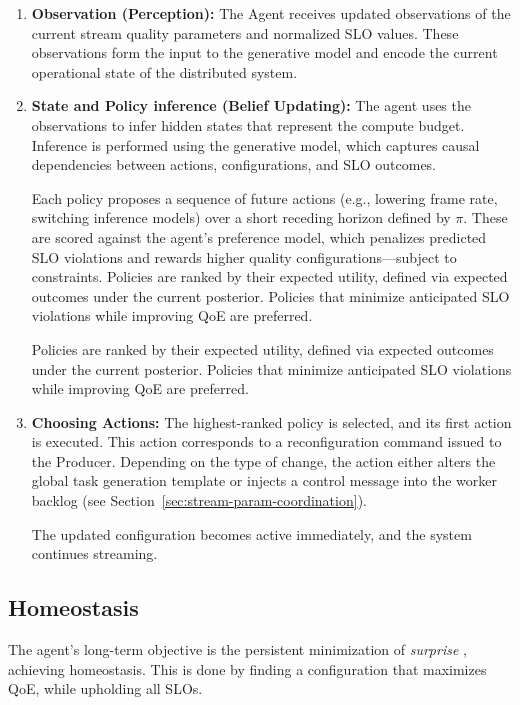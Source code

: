 \begin{enumerate}
    \item \textbf{Observation (Perception):} The Agent receives updated observations of the current stream quality parameters and normalized SLO values. These observations form the input to the generative model and encode the current operational state of the distributed system.
    \item \textbf{State and Policy inference (Belief Updating):} The agent uses the observations to infer hidden states that represent the compute budget. Inference is performed using the generative model, which captures causal dependencies between actions, configurations, and SLO outcomes. 
    
    Each policy proposes a sequence of future actions (e.g., lowering frame rate, switching inference models) over a short receding horizon defined by \(\pi\). These are scored against the agent’s preference model, which penalizes predicted SLO violations and rewards higher quality configurations—subject to constraints. Policies are ranked by their expected utility, defined via expected outcomes under the current posterior. Policies that minimize anticipated SLO violations while improving QoE are preferred.

    Policies are ranked by their expected utility, defined via expected outcomes under the current posterior. Policies that minimize anticipated SLO violations while improving QoE are preferred.
    
    \item \textbf{Choosing Actions:} The highest-ranked policy is selected, and its first action is executed. This action corresponds to a reconfiguration command issued to the Producer. Depending on the type of change, the action either alters the global task generation template or injects a control message into the worker backlog (see Section~\ref{sec:stream-param-coordination}).

The updated configuration becomes active immediately, and the system continues streaming.
\end{enumerate}




\subsection{Homeostasis}
The agent's long-term objective is the persistent minimization of \textit{surprise} \cite{sedlak_adaptive_2024}, achieving homeostasis. This is done by finding a configuration that maximizes QoE, while upholding all SLOs.

